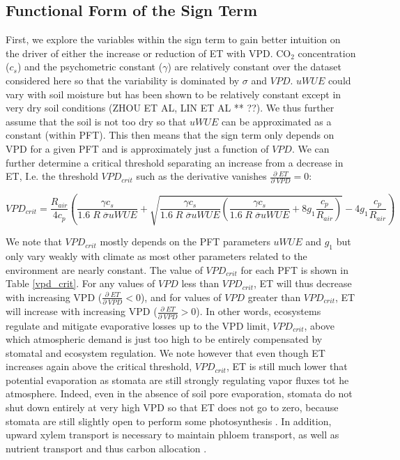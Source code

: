 \documentclass[draft,linenumbers]{agujournal}
\begin{document}
\subsection{Functional Form of the Sign Term}
\label{sign_term}
First, we explore the variables within the sign term to gain better intuition on the driver of either the increase or reduction of ET with VPD. CO$_2$ concentration ($c_s$) and the psychometric constant ($\gamma$) are relatively constant over the dataset considered here so that the variability is dominated by $\sigma$ and $VPD$. $uWUE$ could vary with soil moisture but has been shown to be relatively constant except in very dry soil conditions  (ZHOU ET AL, LIN ET AL ** ??). We thus further assume that the soil is not too dry so that $uWUE$ can be approximated as a constant (within PFT). This then means that the sign term only depends on VPD for a given PFT and is approximately just a function of $VPD$. We can further determine a critical threshold separating an increase from a decrease in ET, I.e. the threshold $VPD_{crit}$ such as the derivative vanishes $\frac{\partial \; ET}{\partial \; VPD} = 0$:

\begin{linenomath*}
  \begin{equation}
VPD_{crit} = \frac{R_{air}}{4 c_p} \left( \frac{\gamma c_s}{1.6\; R \; \overline{\sigma} uWUE} + \sqrt{\frac{\gamma c_s}{1.6\; R \; \overline{\sigma} uWUE}\left( \frac{\gamma c_s}{1.6\; R \; \overline{\sigma} uWUE} + 8 g_1 \frac{c_p}{R_{air}}\right)} - 4 g_1 \frac{c_p}{R_{air}} \right)
\label{vpd_min_et}
  \end{equation}
\end{linenomath*}

We note that $VPD_{crit}$ mostly depends on the PFT parameters $uWUE$ and $g_1$ but only vary weakly with climate as most other parameters related to the environment are nearly constant. The value of $VPD_{crit}$ for each PFT is shown in Table \ref{vpd_crit}. For any values of $VPD$ less than $VPD_{crit}$, ET will thus decrease with increasing VPD ($\frac{\partial \; ET}{\partial \; VPD} < 0$), and for values of $VPD$ greater than $VPD_{crit}$, ET will increase with increasing VPD ($\frac{\partial \; ET}{\partial \; VPD} > 0$). In other words, ecosystems regulate and mitigate evaporative losses up to the VPD limit, $VPD_{crit}$, above which atmospheric demand is just too high to be entirely compensated by stomatal and ecosystem regulation. We note however that even though ET increases again above the critical threshold, $VPD_{crit}$, ET is still much lower that potential evaporation as stomata are still strongly regulating vapor fluxes tot he atmosphere. Indeed, even in the absence of soil pore evaporation, stomata do not shut down entirely at very high VPD so that ET does not go to zero, because stomata are still slightly open to perform some photosynthesis \citep{Ball_1987, Leuning_1990, MEDLYN_2011}. In addition, upward xylem transport is necessary to maintain phloem transport, as well as nutrient transport and thus carbon allocation \citep{De_2013, Nikinmaa_2013, Ryan_2014}.
\end{document}
